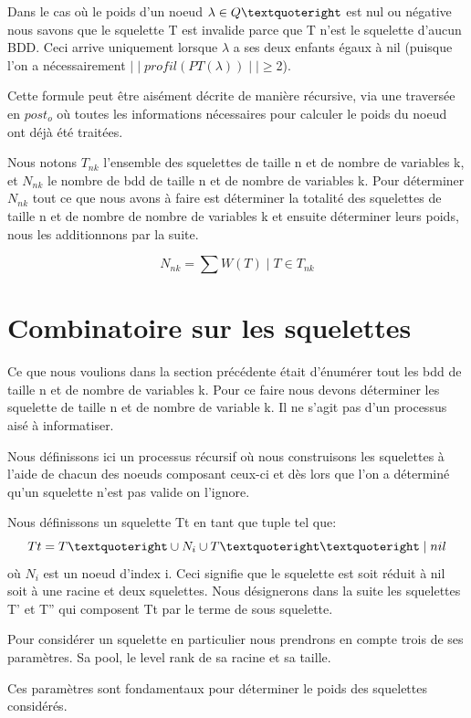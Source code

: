 \documentclass[french]{article}
\begin{document}
Dans le cas où le poids d'un noeud \(\lambda \in Q\textquoteright\) est nul ou négative nous savons que le squelette T est invalide parce que T n'est le squelette d'aucun BDD. Ceci arrive uniquement lorsque \(\lambda\) a ses deux enfants égaux à nil (puisque l'on a nécessairement \(\mid\mid profil(PT(\lambda)) \mid\mid \geq\)2).

Cette formule peut être aisément décrite de manière récursive, via une traversée en \(post_{o}\) où toutes les informations nécessaires pour calculer le poids du noeud ont déjà été traitées.
\vspace{5mm} 

Nous notons \(T_{nk}\) l'ensemble des squelettes de taille n et de nombre de variables k, et \(N_{nk}\) le nombre de bdd de taille n et de nombre de variables k.
Pour déterminer \(N_{nk}\) tout ce que nous avons à faire est déterminer la totalité des squelettes de taille n et de nombre de nombre de variables k et ensuite déterminer leurs poids, nous les additionnons par la suite.

\[N_{nk} = \sum W(T) \mid T \in T_{nk}\]

\section{Combinatoire sur les squelettes}
Ce que nous voulions dans la section précédente était d'énumérer tout les bdd de taille n et de nombre de variables k. Pour ce faire nous devons déterminer les squelette de taille n et de nombre de variable k. Il ne s'agit pas d'un processus aisé à informatiser.

Nous définissons ici un processus récursif où nous construisons les squelettes à l'aide de chacun des noeuds composant ceux-ci et dès lors que l'on a déterminé qu'un squelette n'est pas valide on l'ignore. 
\vspace{5mm} 

Nous définissons un squelette Tt en tant que tuple tel que:
\[Tt = T\textquoteright \cup N_i \cup T\textquoteright\textquoteright \mid nil \]
où \(N_i\) est un noeud d'index i. Ceci signifie que le squelette est soit réduit à nil soit à une racine et deux squelettes. Nous désignerons dans la suite les squelettes T' et T'' qui composent Tt par le terme de sous squelette.

Pour considérer un squelette en particulier nous prendrons en compte trois de ses paramètres. Sa pool, le level rank de sa racine et sa taille.

Ces paramètres sont fondamentaux pour déterminer le poids des squelettes considérés.
\end{document}

